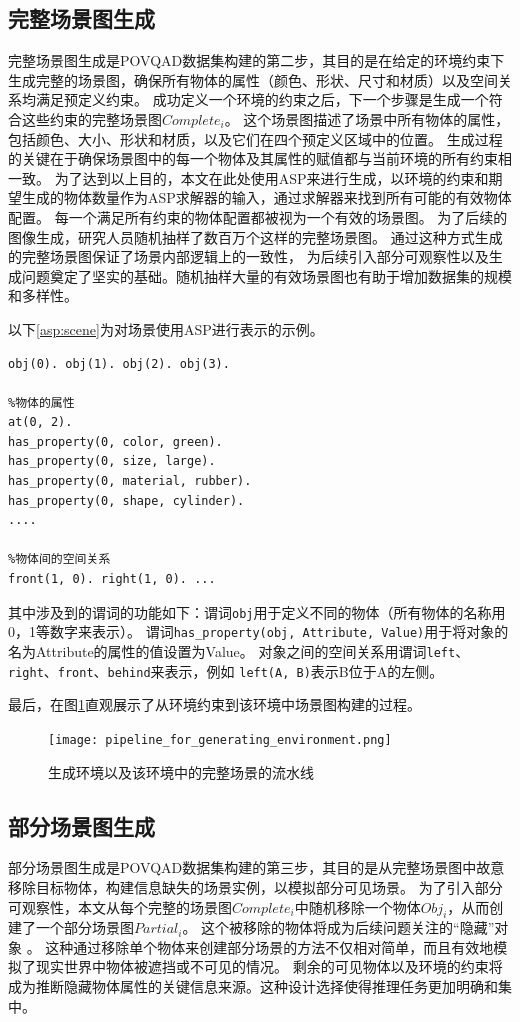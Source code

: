 \subsection{完整场景图生成}
完整场景图生成是POVQAD数据集构建的第二步，其目的是在给定的环境约束下生成完整的场景图，确保所有物体的属性（颜色、形状、尺寸和材质）以及空间关系均满足预定义约束。
成功定义一个环境的约束之后，下一个步骤是生成一个符合这些约束的完整场景图$Complete_i$。
这个场景图描述了场景中所有物体的属性，包括颜色、大小、形状和材质，以及它们在四个预定义区域中的位置。
生成过程的关键在于确保场景图中的每一个物体及其属性的赋值都与当前环境的所有约束相一致。
为了达到以上目的，本文在此处使用ASP来进行生成，以环境的约束和期望生成的物体数量作为ASP求解器的输入，通过求解器来找到所有可能的有效物体配置。
每一个满足所有约束的物体配置都被视为一个有效的场景图。
为了后续的图像生成，研究人员随机抽样了数百万个这样的完整场景图。
通过这种方式生成的完整场景图保证了场景内部逻辑上的一致性，
为后续引入部分可观察性以及生成问题奠定了坚实的基础。随机抽样大量的有效场景图也有助于增加数据集的规模和多样性。   

以下\ref{asp:scene}为对场景使用ASP进行表示的示例。
\begin{lstlisting}[label=asp:scene]
%场景中的物体
obj(0). obj(1). obj(2). obj(3).

%物体的属性
at(0, 2).
has_property(0, color, green).
has_property(0, size, large).
has_property(0, material, rubber).
has_property(0, shape, cylinder).
....

%物体间的空间关系
front(1, 0). right(1, 0). ...
\end{lstlisting}

其中涉及到的谓词的功能如下：谓词\texttt{obj}用于定义不同的物体（所有物体的名称用0，1等数字来表示）。
谓词\texttt{has\_property(obj, Attribute, Value)}用于将对象的名为Attribute的属性的值设置为Value。
对象之间的空间关系用谓词\texttt{left}、\texttt{right}、\texttt{front}、\texttt{behind}来表示，例如
\texttt{left(A, B)}表示B位于A的左侧。

最后，在图\ref{pipeline_for_generating_environment}直观展示了从环境约束到该环境中场景图构建的过程。
\begin{figure}
    \centering
    \texttt{[image: pipeline\_for\_generating\_environment.png]}
    \caption{生成环境以及该环境中的完整场景的流水线}
    \label{pipeline_for_generating_environment}
\end{figure}
\subsection{部分场景图生成}
部分场景图生成是POVQAD数据集构建的第三步，其目的是从完整场景图中故意移除目标物体，构建信息缺失的场景实例，以模拟部分可见场景。
为了引入部分可观察性，本文从每个完整的场景图$Complete_i$中随机移除一个物体$Obj_i$，从而创建了一个部分场景图$Partial_i$。
这个被移除的物体将成为后续问题关注的“隐藏”对象 。
这种通过移除单个物体来创建部分场景的方法不仅相对简单，而且有效地模拟了现实世界中物体被遮挡或不可见的情况。
剩余的可见物体以及环境的约束将成为推断隐藏物体属性的关键信息来源。这种设计选择使得推理任务更加明确和集中。
